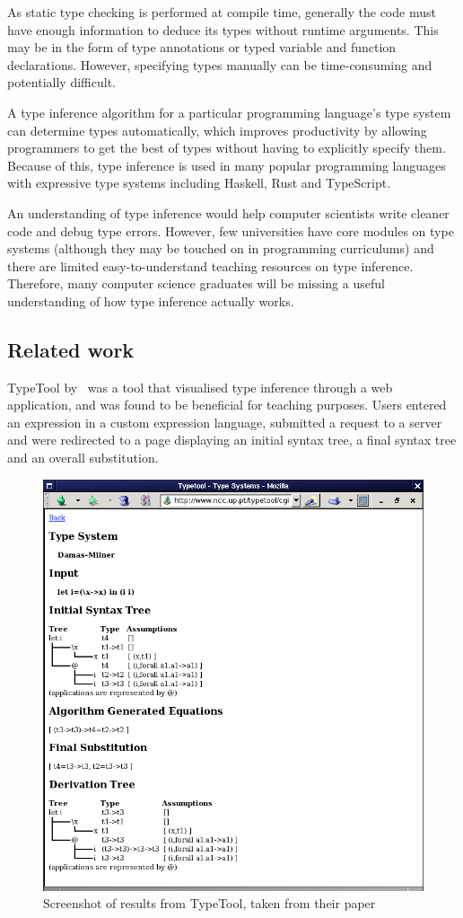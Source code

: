 \documentclass[a4paper,fleqn,12pt]{article}
\begin{document}
As static type checking is performed at compile time, generally the code must have enough information to deduce its types without runtime arguments. This may be in the form of type annotations or typed variable and function declarations. However, specifying types manually can be time-consuming and potentially difficult.

A type inference algorithm for a particular programming language’s type system can determine types automatically, which improves productivity by allowing programmers to get the best of types without having to explicitly specify them. Because of this, type inference is used in many popular programming languages with expressive type systems including Haskell, Rust and TypeScript.

An understanding of type inference would help computer scientists write cleaner code and debug type errors. However, few universities have core modules on type systems (although they may be touched on in programming curriculums) and there are limited easy-to-understand teaching resources on type inference. Therefore, many computer science graduates will be missing a useful understanding of how type inference actually works.
\subsection{Related work}\label{id:h.2mwaav7jkal4}
TypeTool by~\cite{ref4} was a tool that visualised type inference through a web application, and was found to be beneficial for teaching purposes. Users entered an expression in a custom expression language, submitted a request to a server and were redirected to a page displaying an initial syntax tree, a final syntax tree and an overall substitution.

{\centering \begin{figure}[h!]
  \centering
  \includegraphics[width=0.770\linewidth]{images/image2.png}
  \caption{Screenshot of results from TypeTool, taken from their paper}
\end{figure} \par}
\end{document}

